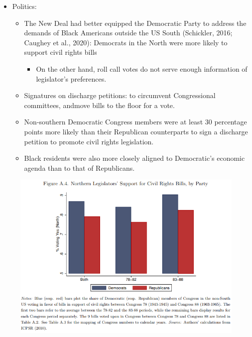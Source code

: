 \documentclass[dvipdfmx,11pt]{beamer}
\begin{document}
\begin{frame}
  \begin{itemize}
    \item Politics:
    \begin{itemize}
      \item The New Deal had better equipped the
      Democratic Party to address the demands of Black Americans outside the US South (Schickler, 2016; Caughey et al., 2020): Democrats in the North
      were more likely to support civil rights bills
      \begin{itemize}
        \item On the other hand, roll call votes do not serve enough information of legislator's preferences.
      \end{itemize}
      \item Signatures on discharge petitions: to circumvent Congressional committees, andmove bills to the floor for a vote.
      \item Non-southern Democratic Congress members were at least 30 percentage points more likely than their Republican counterparts to sign a discharge petition to promote civil rights legislation.
      \item Black residents were also more closely aligned to Democratic's economic agenda than to that of Republicans. 
    \end{itemize}
  \end{itemize}
\end{frame}

\begin{frame}{}
  \begin{figure}
    \centering
    \includegraphics[scale = .5]{fig_tab/os20220708/FA4.png}
  \end{figure}
\end{frame}
\end{document}
